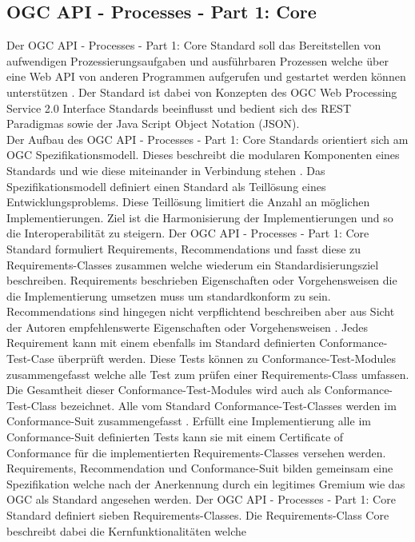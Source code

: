 \subsection{OGC API - Processes - Part 1: Core}
Der OGC API - Processes - Part 1: Core Standard soll das Bereitstellen von aufwendigen Prozessierungsaufgaben und ausführbaren Prozessen welche über eine Web API
 von anderen Programmen aufgerufen und gestartet werden können unterstützen \cite{ogc_api_processes_core}. Der Standard ist dabei von Konzepten des 
OGC Web Processing Service 2.0 Interface Standards beeinflusst und bedient sich des REST Paradigmas sowie der Java Script Object Notation (JSON). \\
Der Aufbau des OGC API - Processes - Part 1: Core Standards orientiert sich am OGC Spezifikationsmodell. Dieses beschreibt die modularen Komponenten eines Standards und 
wie diese miteinander in Verbindung stehen \cite{ogc_specification_model}. Das Spezifikationsmodell definiert einen Standard als Teillösung eines Entwicklungsproblems.
Diese Teillösung limitiert die Anzahl an möglichen Implementierungen. Ziel ist die Harmonisierung der Implementierungen und so die Interoperabilität zu steigern.
Der OGC API - Processes - Part 1: Core Standard formuliert Requirements, Recommendations und fasst diese zu Requirements-Classes zusammen welche wiederum 
ein Standardisierungsziel beschreiben. Requirements beschrieben Eigenschaften oder Vorgehensweisen die die Implementierung umsetzen muss um standardkonform zu sein. 
Recommendations sind hingegen nicht verpflichtend beschreiben aber aus Sicht der Autoren empfehlenswerte Eigenschaften oder Vorgehensweisen \cite{ogc_specification_model}. 
Jedes Requirement kann mit einem ebenfalls im Standard definierten Conformance-Test-Case überprüft werden. Diese Tests können zu Conformance-Test-Modules zusammengefasst 
welche alle Test zum prüfen einer Requirements-Class umfassen. Die Gesamtheit dieser Conformance-Test-Modules wird auch als Conformance-Test-Class bezeichnet. Alle vom 
Standard Conformance-Test-Classes werden im Conformance-Suit zusammengefasst \cite{ogc_specification_model}. Erfüllt eine Implementierung alle im Conformance-Suit definierten 
Tests kann sie mit einem Certificate of Conformance für die implementierten Requirements-Classes versehen werden. Requirements, Recommendation und Conformance-Suit bilden 
gemeinsam eine Spezifikation welche nach der Anerkennung durch ein legitimes Gremium wie das OGC als Standard angesehen werden.
Der OGC API - Processes - Part 1: Core Standard definiert sieben Requirements-Classes. Die Requirements-Class Core beschreibt dabei die Kernfunktionalitäten welche 
